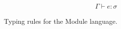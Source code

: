 \begin{figure}[htbp]
\begin{align*}
{\Gamma \vdash e:\sigma}
\end{align*}
\caption[Typing Rules: Module Language]{Typing rules for the Module language. \label{fig:TypeRulesModule}}
\end{figure}


